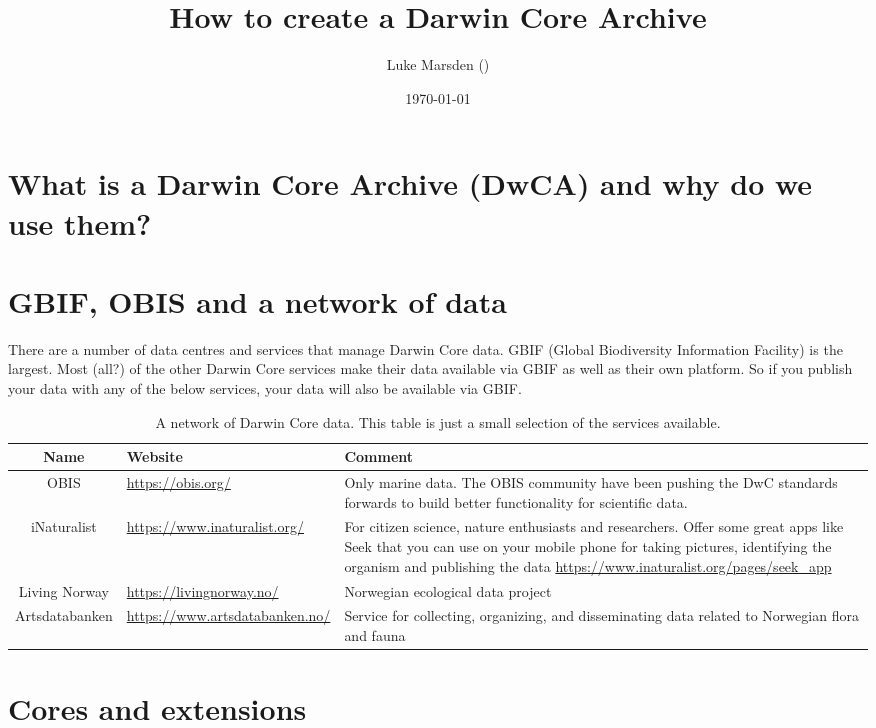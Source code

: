 \documentclass[a4paper,english, 11pt]{article}
\title{How to create a Darwin Core Archive}
\date{\today}
\author{Luke Marsden (\emailme)}
\begin{document}
\maketitle
\tableofcontents
\newpage

\section{What is a Darwin Core Archive (DwCA) and why do we use them?}
\label{s:whatwhy}

\section{GBIF, OBIS and a network of data}
\label{s:gbif}

There are a number of data centres and services that manage Darwin Core data. GBIF (Global Biodiversity Information Facility) is the largest. Most (all?) of the other Darwin Core services make their data available via GBIF as well as their own platform. So if you publish your data with any of the below services, your data will also be available via GBIF.

\begin{table}[h!]
\centering
\caption{A network of Darwin Core data. This table is just a small selection of the services available.}
\begin{tabular}{cp{6cm}p{6.5cm}}
\toprule
Name & Website       & Comment  \\
\midrule
OBIS       & \url{https://obis.org/} & Only marine data. The OBIS community have been pushing the DwC standards forwards to build better functionality for scientific data.      \\
iNaturalist       & \url{https://www.inaturalist.org/} & For citizen science, nature enthusiasts and researchers. Offer some great apps like Seek that you can use on your mobile phone for taking pictures, identifying the organism and publishing the data \url{https://www.inaturalist.org/pages/seek_app}     \\
Living Norway     & \url{https://livingnorway.no/} & Norwegian ecological data project     \\
Artsdatabanken  & \url{https://www.artsdatabanken.no/} &  Service for collecting, organizing, and disseminating data related to Norwegian flora and fauna \\
\bottomrule
\end{tabular}
\end{table} 

\section{Cores and extensions}
\label{s:cores and extensions}
\end{document}
